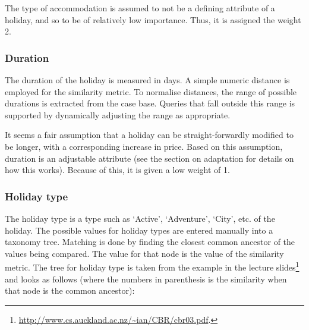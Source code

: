 \documentclass[a4paper,11pt]{scrartcl}
\begin{document}
The type of accommodation is assumed to not be a defining attribute of
a holiday, and so to be of relatively low importance. Thus, it is
assigned the weight 2.

\subsubsection{Duration}
The duration of the holiday is measured in days. A simple numeric
distance is employed for the similarity metric. To normalise
distances, the range of possible durations is extracted from the case
base. Queries that fall outside this range is supported by dynamically
adjusting the range as appropriate.

It seems a fair assumption that a holiday can be straight-forwardly
modified to be longer, with a corresponding increase in price. Based
on this assumption, duration is an adjustable attribute (see the
section on adaptation for details on how this works). Because of this,
it is given a low weight of 1.

\subsubsection{Holiday type}
The holiday type is a type such as `Active', `Adventure', `City', etc.
of the holiday. The possible values for holiday types are entered
manually into a taxonomy tree. Matching is done by finding the closest
common ancestor of the values being compared. The value for that node
is the value of the similarity metric. The tree for holiday type is
taken from the example in the lecture
slides\footnote{\url{http://www.cs.auckland.ac.nz/~ian/CBR/cbr03.pdf}.}
and looks as follows (where the numbers in parenthesis is the
similarity when that node is the common ancestor):

\begin{center}
\end{center}
\end{document}

